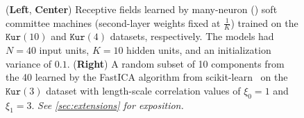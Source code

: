 \begin{figure}[t]
  \caption{
    (\textbf{Left}, \textbf{Center}) Receptive fields learned 
    by many-neuron () 
    soft committee machines (second-layer weights fixed at $\frac{1}{K}$) 
    trained on the $\texttt{Kur}(10)$ and $\texttt{Kur}(4)$ datasets, respectively.
    The models had $N=40$ input units, $K=10$ hidden units, and an initialization variance of $0.1$.
    (\textbf{Right}) A random subset of 10 components from the 40 learned by 
    the FastICA algorithm from scikit-learn~\parencite{hyvarinen1999fast,scikit-learn} on the 
    $\texttt{Kur}(3)$ dataset with 
    length-scale correlation values of $\xi_0 = 1$ and $\xi_1 = 3$. 
    \emph{See \cref{sec:extensions} for exposition.}
  }
  \label{fig:extensions}
\end{figure}
